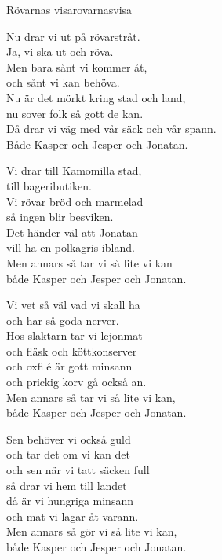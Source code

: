 \begin{song}{Rövarnas visa}{rovarnasvisa}
\begin{vers}
Nu drar vi ut på rövarstråt.\\
Ja, vi ska ut och röva.\\
Men bara sånt vi kommer åt,\\
och sånt vi kan behöva.\\
Nu är det mörkt kring stad och land,\\
nu sover folk så gott de kan.\\
Då drar vi väg med vår säck och vår spann.\\
Både Kasper och Jesper och Jonatan.\\
\end{vers}
\begin{vers}
Vi drar till Kamomilla stad,\\
till bageributiken.\\
Vi rövar bröd och marmelad\\
så ingen blir besviken.\\
Det händer väl att Jonatan\\
vill ha en polkagris ibland.\\
Men annars så tar vi så lite vi kan\\
både Kasper och Jesper och Jonatan.\\
\end{vers}
\newp
\begin{vers}
Vi vet så väl vad vi skall ha\\
och har så goda nerver.\\
Hos slaktarn tar vi lejonmat\\
och fläsk och köttkonserver\\
och oxfilé är gott minsann\\
och prickig korv gå också an.\\
Men annars så tar vi så lite vi kan,\\
både Kasper och Jesper och Jonatan.\\
\end{vers}
\begin{vers}
Sen behöver vi också guld\\
och tar det om vi kan det\\
och sen när vi tatt säcken full\\
så drar vi hem till landet\\
då är vi hungriga minsann\\
och mat vi lagar åt varann.\\
Men annars så gör vi så lite vi kan,\\
både Kasper och Jesper och Jonatan.\\
\end{vers}
\end{song}

